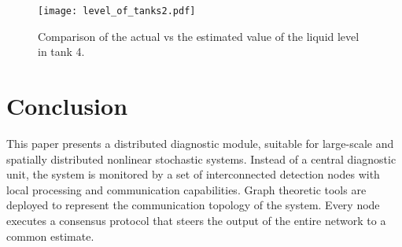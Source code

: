 \documentclass[10pt,twocolumn,twoside]{IEEEtran}
\begin{document}
\begin{figure}
\centering\texttt{[image: level\_of\_tanks2.pdf]}\caption{Comparison of the actual vs the estimated value of the liquid level in tank 4. \label{fig:Comparison-of-the-1}}
\end{figure}

\section{Conclusion}\label{sec:Conclusion}
This paper presents a distributed diagnostic module, suitable for large-scale and spatially distributed nonlinear stochastic systems. Instead of a central diagnostic unit, the system is monitored by a set of interconnected detection nodes with local processing and communication capabilities. Graph theoretic tools are deployed to represent the communication topology of the system. Every node executes a consensus protocol that steers the output of the entire network to a common estimate.  
\end{document}
